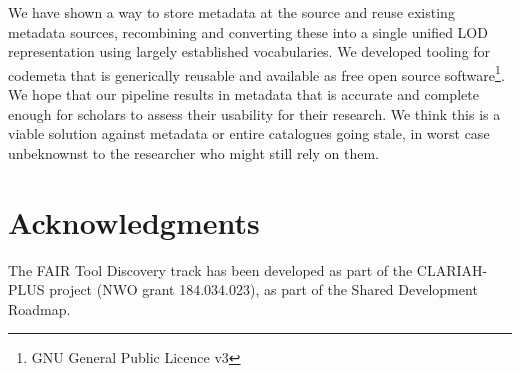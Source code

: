 \documentclass[a4paper,11pt]{article}
\begin{document}
We have shown a way to store metadata at the source and reuse existing metadata
sources, recombining and converting these into a single unified LOD
representation using largely established vocabularies. We developed tooling for
codemeta that is generically reusable and available as free open source
software\footnote{GNU General Public Licence v3}. We hope that our pipeline
results in metadata that is accurate and complete enough for scholars to assess
their usability for their research. We think this is a viable solution
against metadata or entire catalogues going stale, in worst
case unbeknownst to the researcher who might still rely on them.

\section*{Acknowledgments}

The FAIR Tool Discovery track has been developed as part of the CLARIAH-PLUS
project (NWO grant 184.034.023), as part of the Shared Development Roadmap.

\printbibliography
\end{document}
